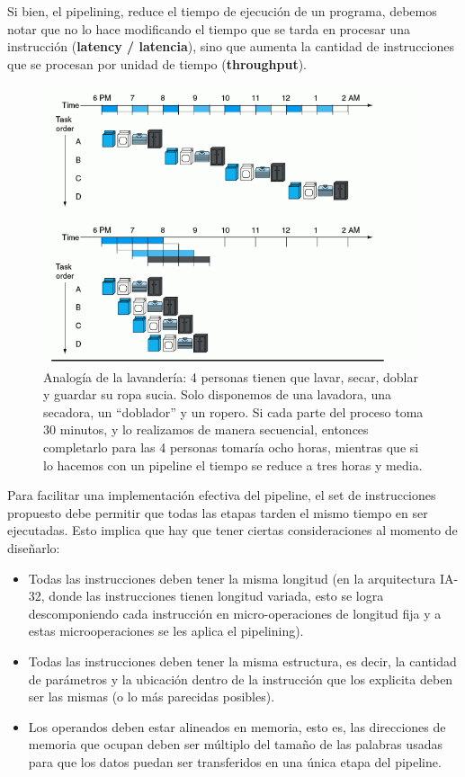 Si bien, el pipelining, reduce el tiempo de ejecución de un programa, debemos notar que no lo hace modificando el tiempo que se tarda en procesar una instrucción (\textbf{latency / latencia}), sino que aumenta la cantidad de instrucciones que se procesan por unidad de tiempo (\textbf{throughput}).
\begin{figure}[h]
	\centering
	\includegraphics[width=0.5\linewidth]{imagenes/pipelining}
	\caption{Analogía de la lavandería: 4 personas tienen que lavar, secar, doblar y guardar su ropa sucia. Solo disponemos de una lavadora, una secadora, un ``doblador'' y un ropero. Si cada parte del proceso toma 30 minutos, y lo realizamos de manera secuencial, entonces completarlo para las 4 personas tomaría ocho horas, mientras que si lo hacemos con un pipeline el tiempo se reduce a tres horas y media.}
	\label{fig:pipelining}
\end{figure}

Para facilitar una implementación efectiva del pipeline, el set de instrucciones propuesto debe permitir que todas las etapas tarden el mismo tiempo en ser ejecutadas. Esto implica que hay que tener ciertas consideraciones al momento de diseñarlo:

\begin{itemize}
	\item Todas las instrucciones deben tener la misma longitud (en la arquitectura IA-32, donde las instrucciones tienen longitud variada, esto se logra descomponiendo cada instrucción en micro-operaciones de longitud fija y a estas microoperaciones se les aplica el pipelining).
	\item Todas las instrucciones deben tener la misma estructura, es decir, la cantidad de parámetros y la ubicación dentro de la instrucción que los explicita deben ser las mismas (o lo más parecidas posibles). 
	\item Los operandos deben estar alineados en memoria, esto es, las direcciones de memoria que ocupan deben ser múltiplo del tamaño de las palabras usadas para que los datos puedan ser transferidos en una única etapa del pipeline.
\end{itemize}

